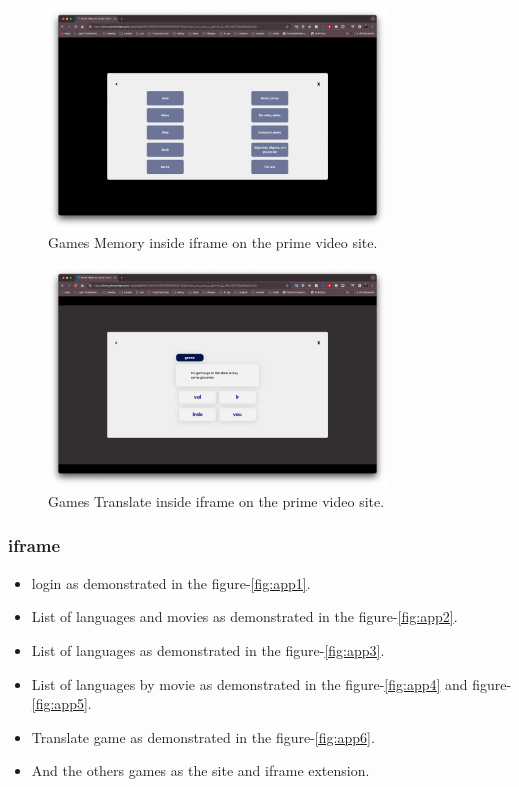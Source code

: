 \documentclass[12pt]{article}
\begin{document}
    \begin{figure}[h]
      \centering
      \caption{
      Games Memory inside iframe on the prime video site.
      }
      \label{fig:iframe3}
      \includegraphics[width=0.8\textwidth]{assets/11.png}
    \end{figure}

    \begin{figure}[h]
      \centering
      \caption{
      Games Translate inside iframe on the prime video site.
      }
      \label{fig:iframe4}
      \includegraphics[width=0.8\textwidth]{assets/12.png}
    \end{figure}

\subsubsection{iframe}
\begin{itemize}
  \item login as demonstrated in the figure-\ref{fig:app1}.
  \item List of languages and movies as demonstrated in the figure-\ref{fig:app2}.
  \item List of languages as demonstrated in the figure-\ref{fig:app3}.
  \item List of languages by movie as demonstrated in the figure-\ref{fig:app4} and figure-\ref{fig:app5}.
  \item Translate game as demonstrated in the figure-\ref{fig:app6}.
  \item And the others games as the site and iframe extension. 
  \end{itemize}
\end{document}

